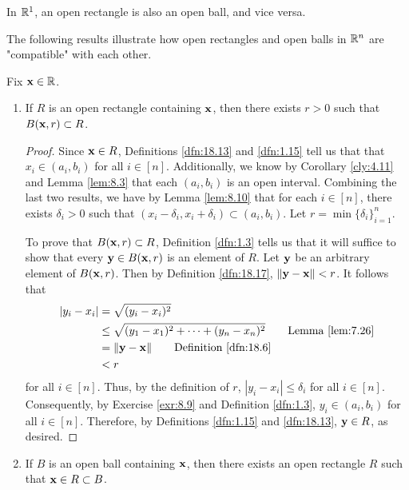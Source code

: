 \documentclass[../main.tex]{subfiles}
\begin{document}
\begin{remark}\label{rmk:18.18}
    In $\mathbb{R}^1$, an open rectangle is also an open ball, and vice versa.
\end{remark}

The following results illustrate how open rectangles and open balls in $\mathbb{R}^n$ are "compatible" with each other.

\begin{lemma}\label{lem:18.19}
    Fix $\mathbf{x}\in\mathbb{R}$.
    \begin{enumerate}[label={\textup{(}\alph*\textup{)}},ref={\thelemma\alph*}]
        \item \label{lem:18.19a}If $R$ is an open rectangle containing $\mathbf{x}$, then there exists $r>0$ such that $B(\mathbf{x},r)\subset R$.
        \begin{proof}
            Since $\mathbf{x}\in R$, Definitions \ref{dfn:18.13} and \ref{dfn:1.15} tell us that that $x_i\in(a_i,b_i)$ for all $i\in[n]$. Additionally, we know by Corollary \ref{cly:4.11} and Lemma \ref{lem:8.3} that each $(a_i,b_i)$ is an open interval. Combining the last two results, we have by Lemma \ref{lem:8.10} that for each $i\in[n]$, there exists $\delta_i>0$ such that $(x_i-\delta_i,x_i+\delta_i)\subset(a_i,b_i)$. Let $r=\min\{\delta_i\}_{i=1}^n$.\par
            To prove that $B(\mathbf{x},r)\subset R$, Definition \ref{dfn:1.3} tells us that it will suffice to show that every $\mathbf{y}\in B(\mathbf{x},r)$ is an element of $R$. Let $\mathbf{y}$ be an arbitrary element of $B(\mathbf{x},r)$. Then by Definition \ref{dfn:18.17}, $\norm{\mathbf{y}-\mathbf{x}}<r$. It follows that
            \begin{align*}
                |y_i-x_i| &= \sqrt{(y_i-x_i)^2}\\
                &\leq \sqrt{(y_1-x_1)^2+\cdots+(y_n-x_n)^2}\tag*{Lemma \ref{lem:7.26}}\\
                &= \norm{\y-\x}\tag*{Definition \ref{dfn:18.6}}\\
                &< r
            \end{align*}
            for all $i\in[n]$. Thus, by the definition of $r$, $|y_i-x_i|\leq\delta_i$ for all $i\in[n]$. Consequently, by Exercise \ref{exr:8.9} and Definition \ref{dfn:1.3}, $y_i\in(a_i,b_i)$ for all $i\in[n]$. Therefore, by Definitions \ref{dfn:1.15} and \ref{dfn:18.13}, $\mathbf{y}\in R$, as desired.
        \end{proof}
        \item \label{lem:18.19b}If $B$ is an open ball containing $\mathbf{x}$, then there exists an open rectangle $R$ such that $\mathbf{x}\in R\subset B$.

\end{enumerate}
\end{lemma}
\end{document}
